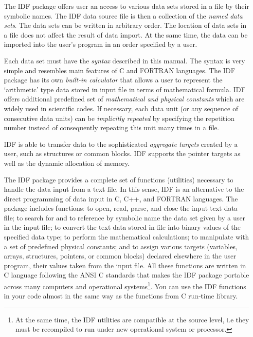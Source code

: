The IDF package offers user an access to various data sets
stored in a file by their symbolic names.
The IDF data source file is then a collection of the {\it named data sets}.
The data sets can be written in arbitrary order.
The location of data sets in a file does not affect
the result of data import.
At the same time, the data can be imported into the
user's program in an order specified by a user.

Each data set must have the {\it syntax} described in this manual.
The syntax is very simple and resembles main features of 
C and FORTRAN languages.
The IDF package has its own {\it built-in calculator} that allows a user 
to represent the `arithmetic' type data  stored in input file in terms of mathematical formula.
IDF offers additional predefined set of {\it mathematical and 
physical constants} which are widely used in scientific codes.
If necessary, each data unit (or any sequence of consecutive data units)
can be {\it implicitly repeated} by specifying the repetition number 
instead of consequently repeating this unit many times in a file.

IDF is able to transfer data to the sophisticated
{\it aggregate targets} created by a user, such as structures or common blocks.
IDF supports the pointer targets 
as well as the dynamic allocation of memory.

The IDF package provides a complete set of functions (utilities)
necessary to handle the data input from a text file.
In this sense, IDF is an alternative to the direct programming 
of data input in C, C++, and FORTRAN languages.
The package includes functions:
to open, read, parse, and close
the input text data file;
to search for and to reference by symbolic name the data set
given by a user in the input file; 
to convert the text data stored in file
into binary values of the specified data type;
to perform the mathematical calculations; 
to manipulate with a set of predefined physical constants;
and to assign various targets (variables, arrays, structures,
pointers, or common blocks) declared elsewhere in the user program,
their values taken from the input file.
All these functions are written in C language
following the ANSI C standards that makes the IDF package portable
across many computers and operational systems\footnote{
At the same time, the IDF utilities are compatible at the source level,
i.e they must be recompiled to run under new operational system or
processor.
}.
You can use the IDF functions in your code almost
in the same way as the functions from  C run-time library.

